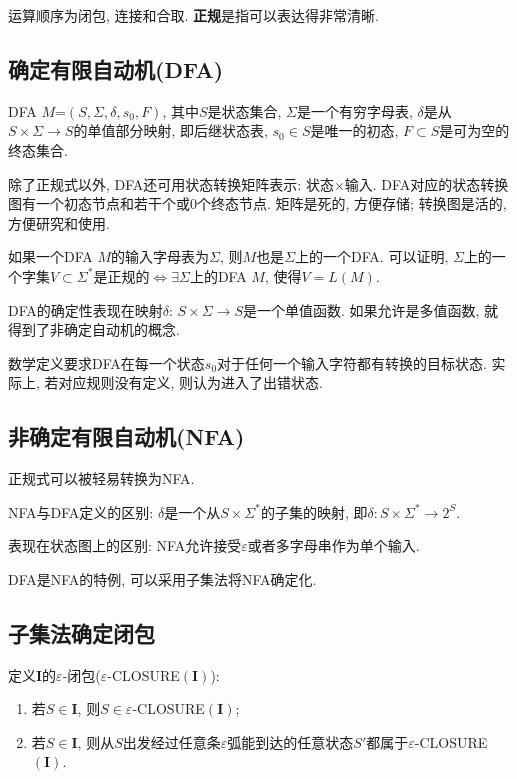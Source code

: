     运算顺序为闭包, 连接和合取. \textbf{正规}是指可以表达得非常清晰.

    \subsection{确定有限自动机(DFA)}

        DFA $M$=$(S,\Sigma,\delta,s_0,F)$, 其中$S$是状态集合, $\Sigma$是一个有穷字母表, $\delta$是从$S\times\Sigma\to S$的单值部分映射, 即后继状态表, $s_0\in S$是唯一的初态, $F\subset S$是可为空的终态集合.

        除了正规式以外, DFA还可用\textsf{状态转换矩阵}表示: 状态$\times$输入. DFA对应的\textsf{状态转换图}有一个初态节点和若干个或0个终态节点. 矩阵是死的, 方便存储; 转换图是活的, 方便研究和使用.

        如果一个DFA $M$的输入字母表为$\Sigma$, 则$M$也是$\Sigma$上的一个DFA. 可以证明, $\Sigma$上的一个字集$V\subset\Sigma^*$是正规的$\iff \exists\Sigma$上的DFA $M$, 使得$V=L(M)$.

        DFA的\textsf{确定性}表现在映射$\delta$: $S\times\Sigma\to S$是一个\textsf{单值函数}. 如果允许是多值函数, 就得到了非确定自动机的概念.

        数学定义要求DFA在每一个状态$s_0$对于任何一个输入字符都有转换的目标状态. 实际上, 若对应规则没有定义, 则认为进入了\textsf{出错}状态.

    \subsection{非确定有限自动机(NFA)}
        
        正规式可以被轻易转换为NFA.

        NFA与DFA定义的区别: $\delta$是一个从$S\times\Sigma^*$的子集的映射, 即$\delta: S\times\Sigma^*\to2^S$.

        表现在状态图上的区别: NFA允许接受$\varepsilon$或者多字母串作为单个输入. 

        DFA是NFA的特例, 可以采用子集法将NFA确定化.

    \subsection{子集法确定闭包}

        定义$\mathbf{I}$的$\varepsilon$-闭包($\varepsilon$-CLOSURE$(\mathbf{I})$):
        \begin{enumerate}
            \item 若$S\in \mathbf{I}$, 则$S\in \varepsilon$-CLOSURE$(\mathbf{I})$;
            \item 若$S\in \mathbf{I}$, 则从$S$出发经过任意条$\varepsilon$弧能到达的任意状态$S'$都属于$\varepsilon$-CLOSURE$(\mathbf{I})$.
        \end{enumerate}

